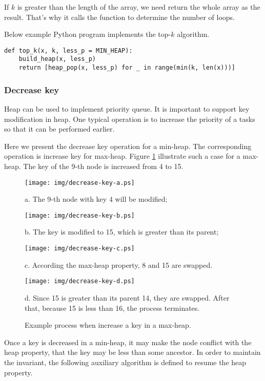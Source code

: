 \documentclass{article}
\begin{document}
If $k$ is greater than the length of the array,
we need return the whole array as the result. That's why it calls
the  function to determine the number of loops.

Below example Python program implements the top-$k$ algorithm.

\lstset{language=Python}
\begin{lstlisting}
def top_k(x, k, less_p = MIN_HEAP):
    build_heap(x, less_p)
    return [heap_pop(x, less_p) for _ in range(min(k, len(x)))]
\end{lstlisting}

\subsubsection{Decrease key}

Heap can be used to implement priority queue. It
is important to support key modification in heap. One typical operation
is to increase the priority of a tasks so that it can be performed
earlier.

Here we present the decrease key operation for a min-heap. The
corresponding operation is increase key for max-heap.
Figure \ref{fig:decrease-key} illustrate such a case for a max-heap.
The key of the 9-th node is increased from 4 to 15.

\begin{figure}[htbp]
  \begin{center}
    \texttt{[image: img/decrease-key-a.ps]}

    a. The 9-th node with key 4 will be modified;

    \texttt{[image: img/decrease-key-b.ps]}

    b. The key is modified to 15, which is greater than its parent;

    \texttt{[image: img/decrease-key-c.ps]}

    c. According the max-heap property, 8 and 15 are swapped.

    \texttt{[image: img/decrease-key-d.ps]}

    d. Since 15 is greater than its parent 14, they are swapped. After that, because 15 is less than 16, the process terminates.

    \caption{Example process when increase a key in a max-heap.} \label{fig:decrease-key}
  \end{center}
\end{figure}

Once a key is decreased in a min-heap, it may make
the node conflict with the heap property, that the key may be less
than some ancestor. In order to maintain the
invariant, the following auxiliary algorithm is defined to resume the heap
property.
\end{document}
